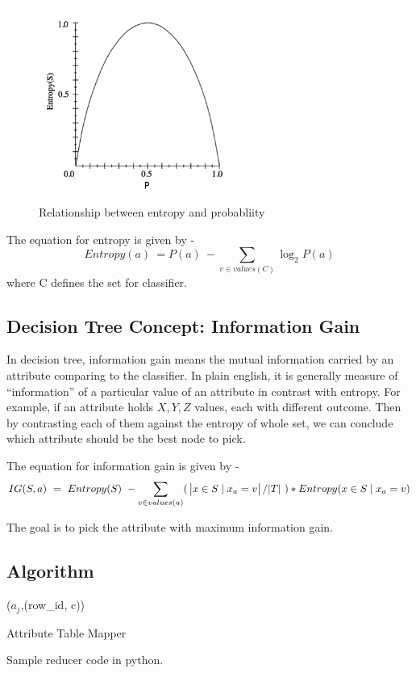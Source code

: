 \documentclass{article}
\begin{document}
\begin{figure}[H]
	\centering
	\includegraphics[width=200pt]{entropy}
	\caption{Relationship between entropy and probabliity}
	\label{fig:entropy}
\end{figure}

The equation for entropy is given by -
\begin{equation}
Entropy(a)\ = P(a)\ - \sum_{v \in values(C)}\log_{2}{P(a)}
\end{equation}
where C defines the set for classifier.

\subsection{Decision Tree Concept: Information Gain}
In decision tree, information gain means the mutual information carried by an attribute comparing to the classifier\cite{wikiinfogain}. In plain english, it is generally measure of ``information'' of a particular value of an attribute in contrast with entropy. For example, if an attribute holds ${X,Y,Z}$ values, each with different outcome. Then by contrasting each of them against the entropy of whole set, we can conclude which attribute should be the best node to pick.

The equation for information gain is given by -
\begin{equation}
IG(S, a)\ =\ Entropy(S)\ - \sum_{v \in values(a)}(\ \abs{x \in S\mid x_{a} = v}/\abs{T}\ ) * Entropy(x \in S\mid x_{a} = v)
\end{equation}

The goal is to pick the attribute with maximum information gain.

\subsection{Algorithm}

\IncMargin{1em}
\begin{algorithm}[H]
\DontPrintSemicolon
{}
\BlankLine
\emit(${a_{j}}$,(row\_id, c))
\caption{Attribute Table Mapper\label{algo:atmap}} Sample reducer code in python.
\end{algorithm}
\DecMargin{1em}
\end{document}
